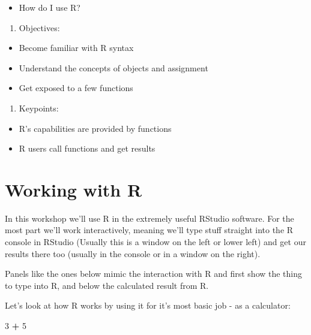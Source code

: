 \documentclass[
]{book}
\newenvironment{Shaded}{\begin{snugshade}}{\end{snugshade}}
\newcommand{\DecValTok}[1]{\textcolor[rgb]{0.00,0.00,0.81}{#1}}
\newcommand{\OperatorTok}[1]{\textcolor[rgb]{0.81,0.36,0.00}{\textbf{#1}}}
\newcommand{\StringTok}[1]{\textcolor[rgb]{0.31,0.60,0.02}{#1}}
\providecommand{\tightlist}{%
  \setlength{\itemsep}{0pt}\setlength{\parskip}{0pt}}
\begin{document}
\begin{itemize}
\tightlist
\item
  How do I use R?
\end{itemize}

\begin{enumerate}
\def\labelenumi{\arabic{enumi}.}
\setcounter{enumi}{1}
\tightlist
\item
  Objectives:
\end{enumerate}

\begin{itemize}
\tightlist
\item
  Become familiar with R syntax
\item
  Understand the concepts of objects and assignment
\item
  Get exposed to a few functions
\end{itemize}

\begin{enumerate}
\def\labelenumi{\arabic{enumi}.}
\setcounter{enumi}{2}
\tightlist
\item
  Keypoints:
\end{enumerate}

\begin{itemize}
\tightlist
\item
  R's capabilities are provided by functions
\item
  R users call functions and get results
\end{itemize}

\hypertarget{working-with-r}{%
\section{Working with R}\label{working-with-r}}

In this workshop we'll use R in the extremely useful RStudio software. For the most part we'll work interactively, meaning we'll type stuff straight into the R console in RStudio (Usually this is a window on the left or lower left) and get our results there too (usually in the console or in a window on the right).

Panels like the ones below mimic the interaction with R and first show the thing to type into R, and below the calculated result from R.

Let's look at how R works by using it for it's most basic job - as a calculator:

\begin{Shaded}
\begin{Highlighting}[]
 \DecValTok{3} \OperatorTok{+}\StringTok{ }\DecValTok{5}
\end{Highlighting}
\end{Shaded}
\end{document}
